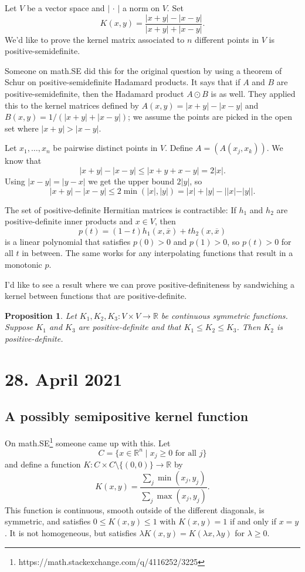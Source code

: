 \documentclass[11pt]{article}
\newtheorem{prop}[theo]{Proposition}
\theoremstyle{definition}
\newcommand{\kk}[1]{\mathbb{#1}}
\def\ov#1{\overline{#1}}
\begin{document}
Let $V$ be a vector space and $| \, \cdot \, |$ a norm on $V$. Set
\[
K(x,y) = \frac{|x+y|-|x-y|}{|x+y|+|x-y|}.
\]
We'd like to prove the kernel matrix associated to $n$ different points in $V$ is positive-semidefinite.

Someone on math.SE did this for the original question by using a theorem of Schur on positive-semidefinite Hadamard products. It says that if $A$ and $B$ are positive-semidefinite, then the Hadamard product $A \odot B$ is as well. They applied this to the kernel matrices defined by $A(x,y) = |x+y|-|x-y|$ and $B(x,y) = 1/(|x+y|+|x-y|)$; we assume the points are picked in the open set where $|x+y| > |x-y|$.

Let $x_1,\ldots,x_n$ be pairwise distinct points in $V$. Define
\(
A = (A(x_j,x_k))
\).
We know that
\[
|x+y|-|x-y| \leq |x + y + x - y| = 2 |x|.
\]
Using $|x-y|=|y-x|$ we get the upper bound $2|y|$, so
\[
|x+y|-|x-y| \leq 2 \min(|x|,|y|) = |x| + |y| - ||x| - |y||.
\]

The set of positive-definite Hermitian matrices is contractible: If $h_1$ and $h_2$ are positive-definite inner products and $x \in V$, then
\[
p(t) = (1-t) h_1(x, \ov x) + t h_2(x, \ov x)
\]
is a linear polynomial that satisfies $p(0) > 0$ and $p(1) > 0$, so $p(t) > 0$ for all $t$ in between. The same works for any interpolating functions that result in a monotonic $p$.



I'd like to see a result where we can prove positive-definiteness by sandwiching a
kernel between functions that are positive-definite.

\begin{prop}
Let $K_1, K_2, K_3 : V \times V \to \kk R$ be continuous symmetric functions. Suppose $K_1$ and $K_3$ are positive-definite and that $K_1 \leq K_2 \leq K_3$. Then $K_2$ is positive-definite.
\end{prop}


\section*{28. April 2021}
\subsection*{A possibly semipositive kernel function}

On math.SE\footnote{https://math.stackexchange.com/q/4116252/3225} someone came up with this. Let
\[
C = \{ x \in \kk R^n \mid x_j \geq 0 \text{ for all $j$}\}
\]
and define a function $K : C \times C \setminus \{(0,0)\} \to \kk R$ by
\[
K(x,y) = \frac{\sum_{j} \min(x_j, y_j)}{\sum_j \max(x_j, y_j)}.
\]
This function is continuous, smooth outside of the different diagonals, is symmetric, and satisfies $0 \leq K(x,y) \leq 1$ with $K(x,y) = 1$ if and only if $x = y$. It is not homogeneous, but satisfies $\lambda K(x,y) = K(\lambda x, \lambda y)$ for $\lambda \geq 0$.
\end{document}
